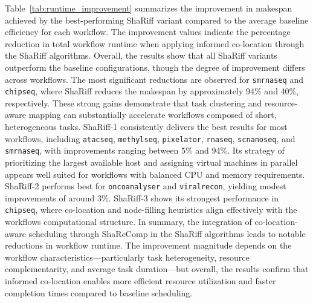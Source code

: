 
\noindent
Table~\ref{tab:runtime_improvement} summarizes the improvement in makespan achieved by the best-performing ShaRiff variant compared to the average baseline efficiency for each workflow. The improvement values indicate the percentage reduction in total workflow runtime when applying informed co-location through the ShaRiff algorithms.
Overall, the results show that all ShaRiff variants outperform the baseline configurations, though the degree of improvement differs across workflows. The most significant reductions are observed for \texttt{smrnaseq} and \texttt{chipseq}, where ShaRiff reduces the makespan by approximately 94\% and 40\%, respectively. These strong gains demonstrate that task clustering and resource-aware mapping can substantially accelerate workflows composed of short, heterogeneous tasks.
ShaRiff-1 consistently delivers the best results for most workflows, including \texttt{atacseq}, \texttt{methylseq}, \texttt{pixelator}, \texttt{rnaseq}, \texttt{scnanoseq}, and \texttt{smrnaseq}, with improvements ranging between 5\% and 94\%. Its strategy of prioritizing the largest available host and assigning virtual machines in parallel appears well suited for workflows with balanced CPU and memory requirements. ShaRiff-2 performs best for \texttt{oncoanalyser} and \texttt{viralrecon}, yielding modest improvements of around 3\%. ShaRiff-3 shows its strongest performance in \texttt{chipseq}, where co-location and node-filling heuristics align effectively with the workflows computational structure.
In summary, the integration of co-location-aware scheduling through ShaReComp in the ShaRiff algorithms leads to notable reductions in workflow runtime. The improvement magnitude depends on the workflow characteristics—particularly task heterogeneity, resource complementarity, and average task duration—but overall, the results confirm that informed co-location enables more efficient resource utilization and faster completion times compared to baseline scheduling.

